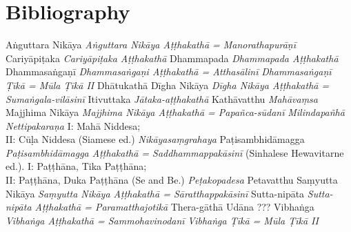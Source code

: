 \ifplastex
	\chapter{Bibliography}
\else
\fi
\begin{thebibliography}{xxxxxxxxxxx}
 Aṅguttara Nikāya
 \emph{Aṅguttara Nikāya Aṭṭhakathā = Manorathapurāṇī}
 Cariyāpiṭaka
 \emph{Cariyāpiṭaka Aṭṭhakathā}
 Dhammapada
 \emph{Dhammapada Aṭṭhakathā}
 Dhammasaṅgaṇī
 \emph{Dhammasaṅgaṇi Aṭṭhakathā = Atthasālinī}
 \emph{Dhammasaṅgaṇī Ṭīkā = Mūla Ṭīkā II}
 Dhātukathā
 Dīgha Nikāya
 \emph{Dīgha Nikāya Aṭṭhakathā = Sumaṅgala-vilāsinī}
 Itivuttaka
 \emph{Jātaka-aṭṭhakathā}
 Kathāvatthu
 \emph{Mahāvaṃsa}
 Majjhima Nikāya
 \emph{Majjhima Nikāya Aṭṭhakathā = Papañca-sūdanī}
 \emph{Milindapañhā}
 \emph{Nettipakaraṇa}
 I: Mahā Niddesa;\\ II: Cūḷa Niddesa (Siamese ed.)
 \emph{Nikāyasaṃgrahaya}
 Paṭisambhidāmagga
 \emph{Paṭisambhidāmagga Aṭṭhakathā = Saddhammappakāsinī} (Sinhalese Hewavitarne ed.).
 I: Paṭṭhāna, Tika Paṭṭhāna;\\ II: Paṭṭhāna, Duka Paṭṭhāna (Se and Be.)
 \emph{Peṭakopadesa}
 Petavatthu
 Saṃyutta Nikāya
 \emph{Saṃyutta Nikāya Aṭṭhakathā = Sāratthappakāsinī}
 Sutta-nipāta
 \emph{Sutta-nipāta Aṭṭhakathā = Paramatthajotikā}
 Thera-gāthā
 Udāna
 ???
 Vibhaṅga
 \emph{Vibhaṅga Aṭṭhakathā = Sammohavinodanī}
 \emph{Vibhaṅga Ṭīkā = Mūla Ṭīkā II}

\end{thebibliography}
